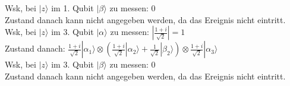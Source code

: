 \documentclass[a4paper]{scrartcl}
\begin{document}
Wsk, bei $|z\rangle$ im 1. Qubit $|\beta\rangle$ zu messen: $0$\\
Zustand danach kann nicht angegeben werden, da das Ereignis nicht eintritt.\\

Wsk, bei $|z\rangle$ im 3. Qubit $|\alpha\rangle$ zu messen: $|\frac{1+i}{\sqrt{2}}| = 1$\\
Zustand danach: $\frac{1+i}{\sqrt{2}} |\alpha_1\rangle \otimes (\frac{1+i}{\sqrt{2}} |\alpha_2\rangle + \frac{1}{\sqrt{2}} |\beta_2\rangle) \otimes \frac{1+i}{\sqrt{2}} |\alpha_3\rangle $\\

Wsk, bei $|z\rangle$ im 3. Qubit $|\beta\rangle$ zu messen: $0$\\
Zustand danach kann nicht angegeben werden, da das Ereignis nicht eintritt.\\
\newpage
\end{document}
